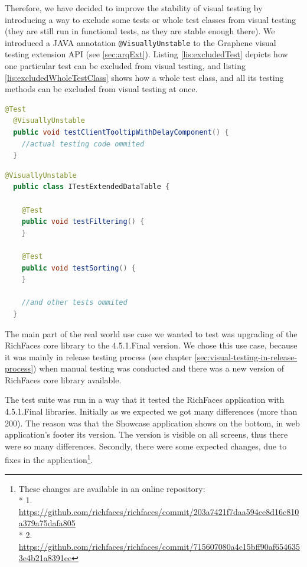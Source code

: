 \documentclass[11pt,oneside,final]{fithesis2}
\begin{document}
  Therefore, we have decided to improve the stability of visual testing by introducing a way to exclude some tests or whole
  test classes from visual testing (they are still run in functional tests, as they are stable enough there). We introduced
  a JAVA annotation \texttt{@VisuallyUnstable} to the Graphene visual testing extension API (see \ref{sec:arqExt}). 
  Listing \ref{lis:excludedTest} depicts how one particular test can be excluded from visual testing, 
  and listing \ref{lis:excludedWholeTestClass} shows how a whole test class, and all its testing methods can be excluded
  from visual testing at once.
  
  \begin{lstlisting}[caption=Exclude functional test from visual testing by annotating it with @VisuallyUnstable,label=lis:excludedTest,language=java]
  @Test
  @VisuallyUnstable
  public void testClientTooltipWithDelayComponent() {
    //actual testing code ommited
  }
  \end{lstlisting}

  \begin{lstlisting}[caption=Exclude whole test class from visual testing by annotating it with @VisuallyUnstable,label=lis:excludedWholeTestClass,language=java]
  @VisuallyUnstable
  public class ITestExtendedDataTable {
    
    @Test
    public void testFiltering() {
    }
    
    @Test
    public void testSorting() {
    }
    
    //and other tests ommited
  }
  \end{lstlisting}
  
  The main part of the real world use case we wanted to test was upgrading of the RichFaces core library to the 4.5.1.Final version.
  We chose this use case, because it was mainly in release testing process (see chapter \ref{sec:visual-testing-in-release-process})
  when manual testing was conducted and there was a new version of RichFaces core library available.
  
  The test suite was run in a way that it tested the RichFaces application with 4.5.1.Final libraries. Initially as we expected we
  got many differences (more than 200). The reason was that the Showcase application shows on the bottom, in web application's footer its version. 
  The version is visible on all screens, thus there were so many differences. Secondly, there were some expected changes, due to
  fixes in the application\footnote{These changes are available in an online repository:\\*
  1. \url{https://github.com/richfaces/richfaces/commit/203a7421f7daa594ce8d16c810a379a75dafa805}\\* 
  2. \url{https://github.com/richfaces/richfaces/commit/715607080a4c15bff90af6546353e4b21a8391ee}}.
  
\end{document}

